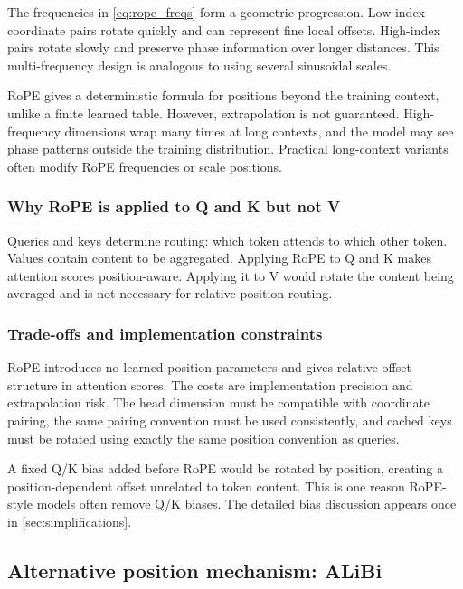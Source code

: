 \documentclass[11pt,a4paper]{article}
\theoremstyle{definition}
\theoremstyle{plain}
\begin{document}
The frequencies in \cref{eq:rope_freqs} form a geometric progression. Low-index coordinate pairs rotate quickly and can represent fine local offsets. High-index pairs rotate slowly and preserve phase information over longer distances. This multi-frequency design is analogous to using several sinusoidal scales.

RoPE gives a deterministic formula for positions beyond the training context, unlike a finite learned table. However, extrapolation is not guaranteed. High-frequency dimensions wrap many times at long contexts, and the model may see phase patterns outside the training distribution. Practical long-context variants often modify RoPE frequencies or scale positions.

\subsubsection{Why RoPE is applied to Q and K but not V}

Queries and keys determine routing: which token attends to which other token. Values contain content to be aggregated. Applying RoPE to Q and K makes attention scores position-aware. Applying it to V would rotate the content being averaged and is not necessary for relative-position routing.

\subsubsection{Trade-offs and implementation constraints}

RoPE introduces no learned position parameters and gives relative-offset structure in attention scores. The costs are implementation precision and extrapolation risk. The head dimension must be compatible with coordinate pairing, the same pairing convention must be used consistently, and cached keys must be rotated using exactly the same position convention as queries.

\begin{connectionbox}
A fixed Q/K bias added before RoPE would be rotated by position, creating a position-dependent offset unrelated to token content. This is one reason RoPE-style models often remove Q/K biases. The detailed bias discussion appears once in \cref{sec:simplifications}.
\end{connectionbox}



\subsection{Alternative position mechanism: ALiBi}
\label{sec:alibi}
\end{document}
